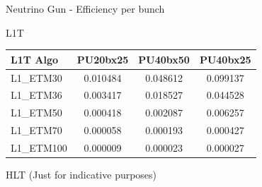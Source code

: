\documentclass[8pt]{beamer}
\begin{document}
\begin{frame}{Neutrino Gun - Efficiency per bunch}

\begin{block}{L1T}
\centering

\begin{tabular}{|l|c|c|c|}
\hline
L1T Algo   & PU20bx25 & PU40bx50 & PU40bx25 \\
\hline \hline
L1\_ETM30  & 0.010484 & 0.048612 & 0.099137 \\                                                                                                                                                                                                                                                        
L1\_ETM36  & 0.003417 & 0.018527 & 0.044528 \\                                                                                                                                                                                                                                                       
L1\_ETM50  & 0.000418 & 0.002087 & 0.006257 \\                                                                                                                                                                                                                                                      
L1\_ETM70  & 0.000058 & 0.000193 & 0.000427 \\
L1\_ETM100 & 0.000009 & 0.000023 & 0.000027 \\                                                                                                                                                                                                                   
\hline
\end{tabular}

\end{block}

\begin{block}{HLT (Just for indicative purposes)}
 

\end{block}
\end{frame}
\end{document}
